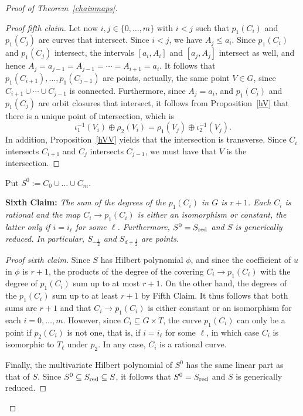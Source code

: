 \documentclass[a4paper,11pt]{amsart}
\theoremstyle{plain}
\theoremstyle{definition}
\theoremstyle{remark}
\def\red{\text{\rm red}}
\begin{document}
\begin{proof}[Proof of Theorem~\ref{chainmaps}]
\begin{proof}[Proof fifth claim]
Let now $i,j\in\{0,\dots,m\}$ with $i<j$ such that $p_1(C_i)$ and $p_1(C_j)$ are curves that intersect. Since $i<j$, we have $A_j\leq a_i$. Since $p_1(C_i)$ and $p_1(C_j)$ intersect, the intervals $[a_i,A_i]$ and $[a_j,A_j]$ intersect as well, and hence $A_j=a_{j-1}=A_{j-1}=\cdots=A_{i+1}=a_i$. It follows that 
$p_1(C_{i+1}),\dots,p_1(C_{j-1})$ are points, actually, the same point $V\in G$, since $C_{i+1}\cup\cdots\cup C_{j-1}$ is connected.  Furthermore, since $A_j=a_i$, and $p_1(C_i)$ and $p_1(C_j)$ are orbit closures that intersect, it follows from Proposition~\ref{hV} that 
there is a unique point of intersection, which is
\[
\iota_1^{-1}(V_i)\oplus\rho_2(V_i)=\rho_1(V_j)\oplus\iota_2^{-1}(V_j).
\]
In addition, Proposition~\ref{hVV} yields that the intersection is transverse. Since 
$C_i$ intersects $C_{i+1}$ and $C_j$ intersects $C_{j-1}$, we must have that $V$ is the intersection.
\end{proof}

Put $S^0:=C_0\cup\dots\cup C_m$. 

\vskip0.2cm

{\bf Sixth Claim:} {\it The sum of the degrees of the $p_1(C_i)$ in $G$ is $r+1$. Each $C_i$ is rational and the map $C_i\to p_1(C_i)$ is either an isomorphism or constant, the latter only if $i=i_\ell$ for some $\ell$. Furthermore, $S^0=S_\red$ and $S$ is generically reduced. In particular, $S_{-\frac{1}{2}}$ and $S_{d+\frac{1}{2}}$ are points.}

\begin{proof}[Proof sixth claim] Since $S$ has Hilbert polynomial $\phi$, and since the coefficient of $u$ in $\phi$ is $r+1$, the products of the degree of the covering $C_i\to p_1(C_i)$ with the degree of $p_1(C_i)$ sum up to at most $r+1$. On the other hand, the degrees of the $p_1(C_i)$ sum up to at least $r+1$ by Fifth Claim. It thus follows that both sums are $r+1$ and that $C_i\to p_1(C_i)$ is either constant or an isomorphism for each $i=0,\dots,m$. However, since $C_i\subseteq G\times T$, the curve $p_1(C_i)$ can only be a point if $p_2(C_i)$ is not one, that is, if $i=i_\ell$ for some $\ell$, in which case $C_i$ is isomorphic to $T_\ell$ under $p_2$. In any case, $C_i$ is a rational curve. 

Finally, the multivariate Hilbert polynomial of $S^0$ has the same linear part as that of $S$. Since $S^0\subseteq S_\red\subseteq S$, it follows that $S^0=S_\red$ and $S$ is generically reduced. 
\end{proof}

\vskip0.2cm


\end{proof}
\end{document}
